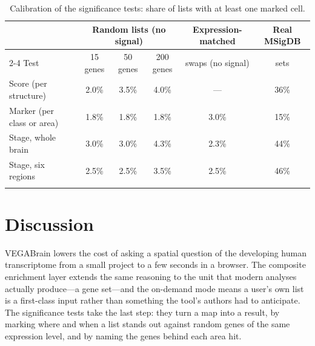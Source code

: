 \documentclass[pdflatex,sn-basic]{sn-jnl}
\begin{document}
\begin{table}[htbp]
\centering
\caption{Calibration of the significance tests: share of lists with at least
one marked cell.}\label{tab:tests}
\footnotesize
\setlength{\tabcolsep}{4pt}
\begin{tabular}{@{}lccccc@{}}
\toprule
& \multicolumn{3}{c}{Random lists (no signal)} & Expression-matched & Real MSigDB \\
\cmidrule(lr){2-4}
Test & 15 genes & 50 genes & 200 genes & swaps (no signal) & sets \\
\midrule
Score (per structure)          & 2.0\% & 3.5\% & 4.0\% & ---   & 36\% \\
Marker (per class or area)     & 1.8\% & 1.8\% & 1.8\% & 3.0\% & 15\% \\
Stage, whole brain             & 3.0\% & 3.0\% & 4.3\% & 2.3\% & 44\% \\
Stage, six regions             & 2.5\% & 2.5\% & 3.5\% & 2.5\% & 46\% \\
\botrule
\end{tabular}
\end{table}

\section{Discussion}\label{sec:discussion}

VEGABrain lowers the cost of asking a spatial question of the developing human
transcriptome from a small project to a few seconds in a browser. The composite enrichment layer extends the same reasoning to the
unit that modern analyses actually produce---a gene set---and the on-demand mode
means a user's own list is a first-class input rather than something the tool's
authors had to anticipate. The significance tests take the last step: they turn
a map into a result, by marking where and when a list stands out against random
genes of the same expression level, and by naming the genes behind each area
hit.
\end{document}
